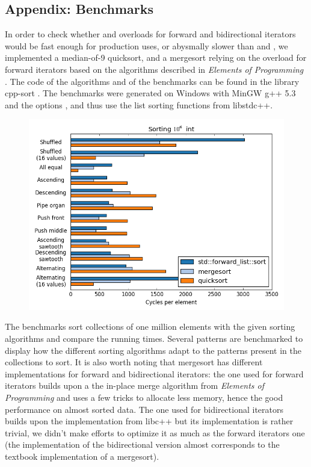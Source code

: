 \documentclass{isocpp_proposal}
\begin{document}
\newpage
\begin{appendices}
\section*{Appendix: Benchmarks} \label{App:Benchmarks}

In order to check whether  and  overloads for forward and bidirectional iterators would be fast enough for production uses, or abysmally slower than  and , we implemented a median-of-9 quicksort, and a mergesort relying on the  overload for forward iterators based on the algorithms described in \emph{Elements of Programming} \cite{EOP}. The code of the algorithms and of the benchmarks can be found in the library cpp-sort \cite{cpp-sort}. The benchmarks were generated on Windows with MinGW g++ 5.3 and the options , and thus use the list sorting functions from libstdc++.

\begin{figure}[h]
\includegraphics[width=\textwidth]{forward-list-int.png}
\end{figure}

The benchmarks sort collections of one million elements with the given sorting algorithms and compare the running times. Several patterns are benchmarked to display how the different sorting algorithms adapt to the patterns present in the collections to sort. It is also worth noting that mergesort has different implementations for forward and bidirectional iterators: the one used for forward iterators builds upon a the in-place merge algorithm from \emph{Elements of Programming} and uses a few tricks to allocate less memory, hence the good performance on almost sorted data. The one used for bidirectional iterators builds upon the  implementation from libc++ but its implementation is rather trivial, we didn't make efforts to optimize it as much as the forward iterators one (the implementation of the bidirectional version almost corresponds to the textbook implementation of a mergesort).


\end{appendices}
\end{document}
